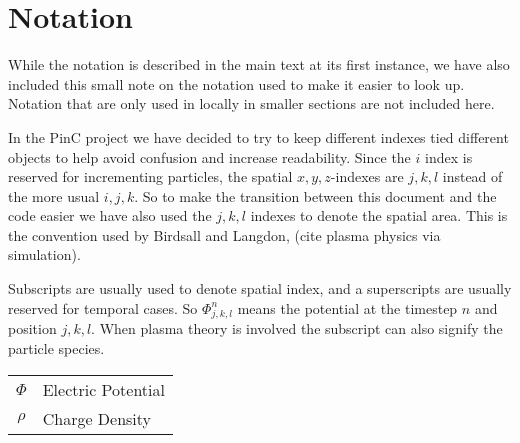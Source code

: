 \section{Notation}
  While the notation is described in the main text at its first instance, we have also included
  this small note on the notation used to make it easier to look up.
  Notation that are only used in locally in smaller sections are not included here.

  In the PinC project we have decided to try to keep different indexes tied different
  objects to help avoid confusion and increase readability. Since the \(i\) index is
  reserved for incrementing particles, the spatial \(x,y,z\)-indexes are \(j,k,l\) instead of the
  more usual \(i,j,k\). So to make the transition between this document and the code
  easier we have also used the \(j,k,l\) indexes to denote the spatial area.
  This is the convention used by Birdsall and Langdon, (cite plasma physics via simulation).


  Subscripts are usually used to denote spatial index, and a superscripts are usually
  reserved for temporal cases. So \( \Phi^n_{j,k,l} \) means the potential at
  the timestep \(n\) and position \(j,k,l\). When plasma theory is involved the subscript
  can also signify the particle species.


  \begin{centering}
    \begin{tabular}{c |l}
      \(\Phi\) & Electric Potential
      \\
      \(\rho\) & Charge Density
      \\

    \end{tabular}
  \end{centering}
